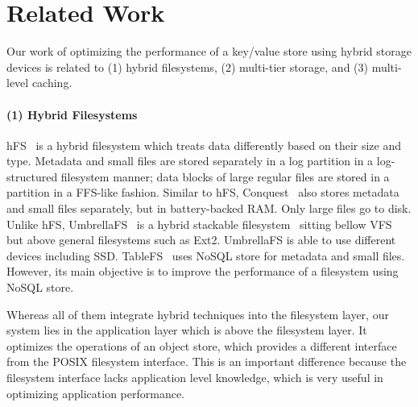 \section{Related Work} 
\label{sec:related} 
Our work of optimizing the performance of a key/value store using
hybrid storage devices is related to (1) hybrid filesystems, (2)
multi-tier storage, and (3) multi-level caching. 

\paragraph{(1) Hybrid Filesystems}

hFS~\cite{eurosys_hfs} is a hybrid filesystem which treats data
differently based on their size and type. Metadata and small files are
stored separately in a log partition in a log-structured filesystem
manner; data blocks of large regular files are stored in a partition
in a FFS-like fashion. Similar to hFS, Conquest~\cite{conquest_tos}
also stores metadata and small files separately, but in battery-backed
RAM.  Only large files go to disk. Unlike hFS,
UmbrellaFS~\cite{umbrellafs_gos} is a hybrid stackable
filesystem~\cite{tos06zen} sitting bellow VFS but above general
filesystems such as Ext2.  UmbrellaFS is able to use different devices
including SSD.  TableFS~\cite{tablefs} uses NoSQL store for metadata
and small files.  However, its main objective is to improve the
performance of a filesystem using NoSQL store.

Whereas all of them integrate hybrid techniques into the filesystem
layer, our system lies in the application layer which is above the
filesystem layer. It optimizes the operations of an object store,
which provides a different interface from the POSIX filesystem
interface. This is an important difference because the filesystem
interface lacks application level knowledge, which is very useful in
optimizing application performance.

